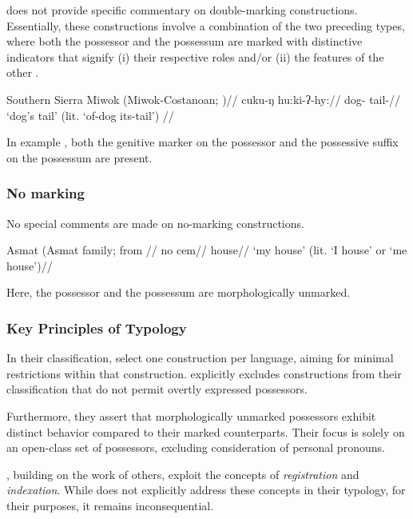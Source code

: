 \cite{nichols_locus_2013} does not provide specific commentary on double-marking constructions. Essentially, these constructions involve a combination of the two preceding types, where both the possessor and the possessum are marked with distinctive indicators that signify (i) their respective roles and/or (ii) the features of the other .

\ex
\label{doublemarking}
\begingl
\glpreamble Southern Sierra Miwok (Miwok-Costanoan; \citealt[133]{Broadbent-1964})//
\gla cuku-ŋ hu:ki-ʔ-hy://
\glb dog-\Gen{} tail-\Tsg//
\glft `dog's tail’ (lit. `of-dog its-tail’) //
\endgl
\xe

In example , both the genitive marker on the possessor and the possessive suffix on the possessum are present.

\subsubsection{No marking}

No special comments are made on no-marking constructions.

\ex
\begingl
\glpreamble Asmat (Asmat family; \citealt[136, 133]{Voorhoeve-1965b} from \citealt{nichols_locus_2013}//
\gla no cem//
\glb \Fsg{} house//
\glft `my house' (lit. `I house' or `me house')//
\endgl
\xe

Here, the possessor and the possessum are morphologically unmarked.

\subsubsection{Key Principles of \cite{nichols_locus_2013} Typology}

In their classification, \cite{nichols_locus_2013} select one construction per language, aiming for minimal restrictions within that construction. \cite{nichols_locus_2013} explicitly excludes constructions from their classification that do not permit overtly expressed possessors.

Furthermore, they assert that morphologically unmarked possessors exhibit distinct behavior compared to their marked counterparts. Their focus is solely on an open-class set of possessors, excluding consideration of personal pronouns.

\cite{lander2020head}, building on the work of others, exploit the concepts of \textit{registration} and \textit{indexation}. While \cite{nichols_locus_2013} does not explicitly address these concepts in their typology, for their purposes, it remains inconsequential.

